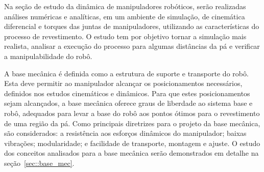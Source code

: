 Na seção de estudo da dinâmica de manipuladores robóticos, serão realizadas
análises numéricas e analíticas, em um ambiente de simulação, de cinemática
diferencial e torques das juntas de manipuladores, utilizando as características
do processo de revestimento. O estudo tem por objetivo tornar a simulação mais
realista, analisar a execução do processo para algumas distâncias da pá
e verificar a manipulabilidade do robô.

A base mecânica é definida como a estrutura de suporte e transporte do robô.
Esta deve permitir ao manipulador alcançar os posicionamentos necessários, 
definidos nos estudos cinemáticos e dinâmicos. Para que estes
posicionamentos sejam alcançados, a base mecânica oferece graus de
liberdade ao sistema base e robô, adequados para levar a base do robô aos pontos
ótimos para o revestimento de uma região da pá. Como principais diretrizes para
o projeto da base mecânica, são considerados: a resistência aos esforços dinâmicos do
manipulador; baixas vibrações; modularidade; e facilidade de transporte,
montagem e ajuste. O estudo dos conceitos analisados para a base mecânica serão
demonstrados em detalhe na seção~\ref{sec::base_mec}.


